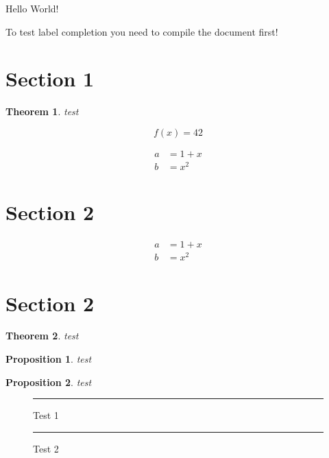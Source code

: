 \documentclass{article}
\numberwithin{equation}{section}
\newtheorem{theorem}{Theorem}
\newtheorem{proposition}{Proposition}
\begin{document}
Hello World!

To test label completion you need to compile the document first!

\section{Section 1}

\begin{theorem}
  \label{th:first}
  test
\end{theorem}

\begin{equation}
  \tag{1.0}
  f(x) = 42
  \label{eq:main-is-working}
\end{equation}

\begin{align}
  \label{eq:test1}
  a &= 1 + x \\
  \label{eq:aligned}
  b &= x^2
\end{align}

\section{Section 2}

\begin{subequations}
  \begin{align}
    \label{eq:sub1}
    a &= 1 + x \\
    \label{eq:sub2}
    b &= x^2
  \end{align}
\end{subequations}

\section{Section 2}

\begin{theorem}
  \label{th:second}
  test
\end{theorem}

\begin{proposition}
  \label{prop:first}
  test
\end{proposition}

\begin{proposition}
  \label{prop:second}
  test
\end{proposition}

\begin{figure}
  \centering
  \rule{1cm}{1cm}
  \caption{Test 1}
  \label{fig:test1}
\end{figure}

\begin{figure}
  \centering
  \rule{1cm}{1cm}
  \caption{Test 2}
  \label{fig:test2}
\end{figure}
\end{document}
